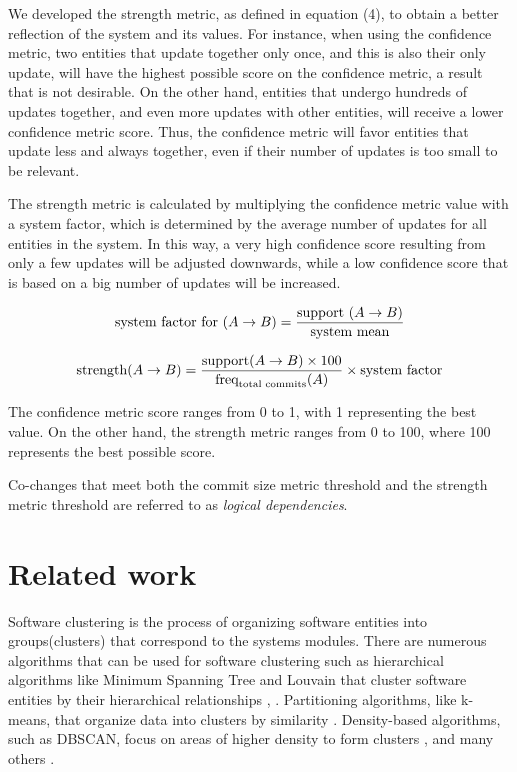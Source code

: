\documentclass[conference]{IEEEtran}
\begin{document}
We developed the strength metric, as defined in equation (4), to obtain a better reflection of the system and its values. For instance, when using the confidence metric, two entities that update together only once, and this is also their only update, will have the highest possible score on the confidence metric, a result that is not desirable. On the other hand, entities that undergo hundreds of updates together, and even more updates with other entities, will receive a lower confidence metric score. Thus, the confidence metric will favor entities that update less and always together, even if their number of updates is too small to be relevant.


 The strength metric is calculated by multiplying the confidence metric value with a system factor, which is determined by the average number of updates for all entities in the system. In this way, a very high confidence score resulting from only a few updates will be adjusted downwards, while a low confidence score that is based on a big number of updates will be increased.

\begin{equation}
\small
\text{system factor for }(A \rightarrow B) = \frac{\text{support }(A \rightarrow B)}{\text{system mean}}
\end{equation}

\begin{equation}
\small
\text{strength}(A \rightarrow B) = \frac{\text{support}(A \rightarrow B) \times 100}{\text{freq}_{\text{total commits}}(A)} \times \text{system factor}
\end{equation}

The confidence metric score ranges from 0 to 1, with 1 representing the best value. On the other hand, the strength metric ranges from 0 to 100, where 100 represents the best possible score.

Co-changes that meet both the commit size metric threshold and the strength metric threshold are referred to as \textit{logical dependencies}.

\section{Related work}
\label{related_work}

Software clustering is the process of organizing software entities into groups(clusters) that correspond to the systems modules. There are numerous algorithms that can be used for software clustering such as hierarchical algorithms like Minimum Spanning Tree and Louvain that cluster software entities by their hierarchical relationships \cite{hicluster}, \cite{SoraSem13}. Partitioning algorithms, like k-means, that organize data into clusters by similarity \cite{5453745}. Density-based algorithms, such as DBSCAN, focus on areas of higher density to form clusters \cite{10.1145/304181.304187}, and many others \cite{Xu2015ACS}. 
\end{document}
